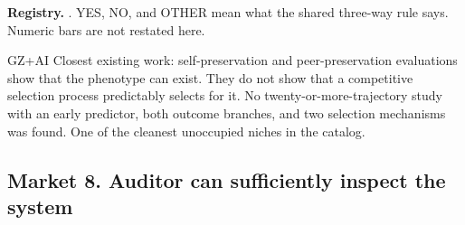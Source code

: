 \begin{predictionresolution}
\textbf{Registry.} . YES, NO, and OTHER mean what the shared three-way rule says. Numeric bars are not restated here.
\end{predictionresolution}
\begin{authbar}{GZ+AI}
Closest existing work: self-preservation and peer-preservation evaluations \autocite{schlatter2026shutdownresistance,potter2026peerpreservation,knecht2026shutdownsabotage} show that the phenotype can exist.
They do not show that a competitive selection process predictably selects for it.
No twenty-or-more-trajectory study with an early predictor, both outcome branches, and two selection mechanisms was found.
One of the cleanest unoccupied niches in the catalog.
\end{authbar}
\authbarneedspace

\subsection{Market 8. Auditor can sufficiently inspect the system}
\label{sec:appp-m8}

